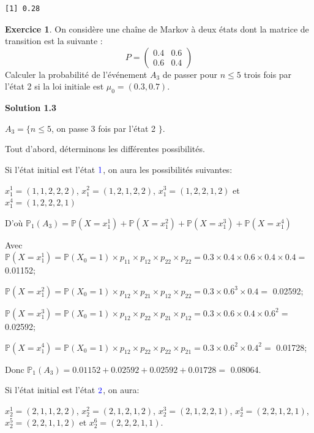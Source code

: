 \documentclass[
]{book}
\theoremstyle{definition}
\theoremstyle{definition}
\theoremstyle{definition}
\newtheorem{exercise}{Exercice}[chapter]
\theoremstyle{remark}
\begin{document}
\begin{verbatim}
[1] 0.28
\end{verbatim}

\begin{exercise}
\protect\hypertarget{exr:unnamed-chunk-56}{}{\label{exr:unnamed-chunk-56} } On considère une chaîne de Markov à deux états dont la matrice de transition est la suivante :
\[ P=\left( 
  \begin{array}{cc}
0.4 & 0.6 \\
0.6 & 0.4 
\end{array}
\right)\]
Calculer la probabilité de l'événement \(A_3\) de passer pour \(n \leq 5\) trois fois par l'état 2 si la loi initiale est \(\mu_0=(0.3,0.7)\).
\end{exercise}

\textbf{Solution 1.3}

\(A_3=\{n \leq 5\), on passe 3 fois par l'état 2 \(\}\).

Tout d'abord, déterminons les différentes possibilités.

Si l'état initial est l'état \(\color{blue}{1}\), on aura les possibilités suivantes:

\(x_1^1=(1, 1, 2, 2, 2)\), \(x_1^2=(1, 2,1, 2, 2)\), \(x_1^3=(1 ,2 ,2 ,1 , 2)\) et \(x_1^4=(1 , 2, 2, 2, 1)\)

D'où \(\mathbb{P}_1(A_3)=\mathbb{P}(X=x_1^1)+\mathbb{P}(X=x_1^2)+\mathbb{P}(X=x_1^3)+\mathbb{P}(X=x_1^4)\)

Avec \(\mathbb{P}(X=x_1^1)=\mathbb{P}(X_0=1)\times p_{11}\times p_{12}\times p_{22}\times p_{22}=0.3 \times 0.4 \times 0.6 \times 0.4 \times 0.4=\) 0.01152;

\(\mathbb{P}(X=x_1^2)=\mathbb{P}(X_0=1) \times p_{12}\times p_{21}\times p_{12}\times p_{22}=0.3\times 0.6^3 \times 0.4 =\) 0.02592;

\(\mathbb{P}(X=x_1^3)=\mathbb{P}(X_0=1)\times p_{12}\times p_{22}\times p_{21}\times p_{12}=0.3\times 0.6 \times 0.4 \times 0.6^2 =\) 0.02592;

\(\mathbb{P}(X=x_1^4)=\mathbb{P}(X_0=1)\times p_{12}\times p_{22}\times p_{22}\times p_{21}=0.3\times 0.6^2 \times 0.4^2 =\) 0.01728;

Donc \(\mathbb{P}_1(A_3)= 0.01152+0.02592+0.02592+0.01728=\) 0.08064.

Si l'état initial est l'état \(\color{blue}{2}\), on aura:

\(x_2^1=(2,1, 1, 2, 2)\), \(x_2^2=(2, 1, 2, 1,2)\), \(x_2^3=(2 , 1 , 2, 2, 1)\), \(x_2^4=(2, 2, 1, 2, 1)\), \(x_2^5=(2, 2 , 1 , 1 , 2)\) et \(x_2^6=(2, 2, 2 , 1 , 1)\).
\end{document}
